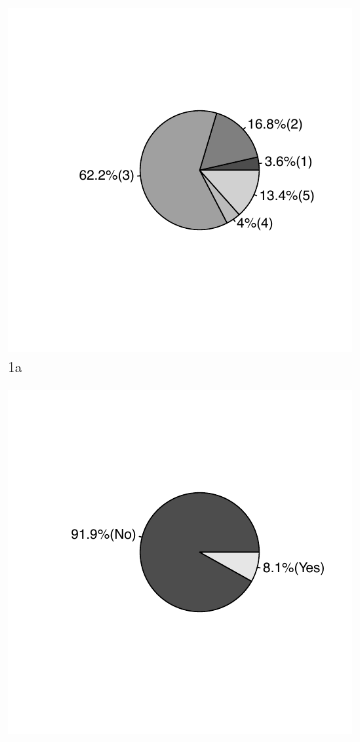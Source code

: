 \documentclass[10pt, conference]{IEEEtran}
\begin{document}
\begin{figure}[!hbt]
\begin{subfigure}{.5\textwidth}
  \centering
  \includegraphics{figures/ds_distribution_1.pdf}
  \caption{1a}
  \label{fig:sfig1}
\end{subfigure}%
\begin{subfigure}{.5\textwidth}
  \centering
  \includegraphics{figures/ds_distribution_2.pdf}

\end{subfigure}
\end{figure}
\end{document}
